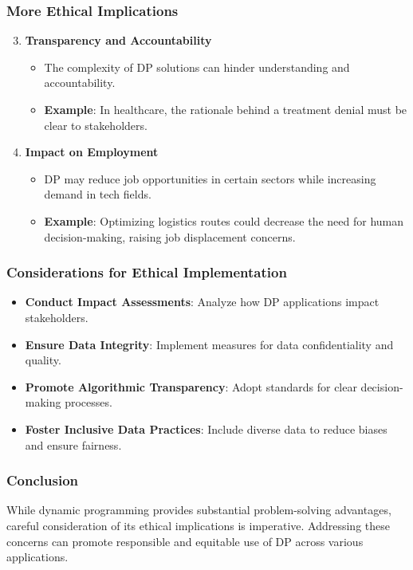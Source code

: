 \documentclass[aspectratio=169]{beamer}
\begin{document}
\begin{frame}[fragile]
  \frametitle{More Ethical Implications}
  
  \begin{enumerate}
    \setcounter{enumi}{2} %
    \item \textbf{Transparency and Accountability}
    \begin{itemize}
      \item The complexity of DP solutions can hinder understanding and accountability.
      \item \textbf{Example}: In healthcare, the rationale behind a treatment denial must be clear to stakeholders.
    \end{itemize}

    \item \textbf{Impact on Employment}
    \begin{itemize}
      \item DP may reduce job opportunities in certain sectors while increasing demand in tech fields.
      \item \textbf{Example}: Optimizing logistics routes could decrease the need for human decision-making, raising job displacement concerns.
    \end{itemize}
  \end{enumerate}
\end{frame}

\begin{frame}[fragile]
  \frametitle{Considerations for Ethical Implementation}
  
  \begin{itemize}
    \item \textbf{Conduct Impact Assessments}: Analyze how DP applications impact stakeholders.
    \item \textbf{Ensure Data Integrity}: Implement measures for data confidentiality and quality.
    \item \textbf{Promote Algorithmic Transparency}: Adopt standards for clear decision-making processes.
    \item \textbf{Foster Inclusive Data Practices}: Include diverse data to reduce biases and ensure fairness.
  \end{itemize}
\end{frame}

\begin{frame}[fragile]
  \frametitle{Conclusion}
  
  While dynamic programming provides substantial problem-solving advantages, careful consideration of its ethical implications is imperative. Addressing these concerns can promote responsible and equitable use of DP across various applications.
\end{frame}
\end{document}
